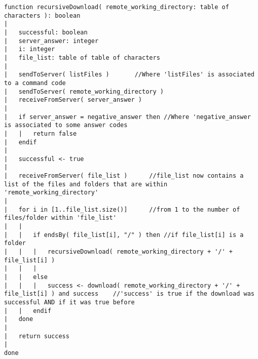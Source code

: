 \begin{lstlisting}
function recursiveDownload( remote_working_directory: table of characters ): boolean
|
|	successful: boolean
|	server_answer: integer
|	i: integer
|	file_list: table of table of characters
|
|	sendToServer( listFiles )		//Where 'listFiles' is associated to a command code
|	sendToServer( remote_working_directory )
|	receiveFromServer( server_answer )
|
|	if server_answer = negative_answer then	//Where 'negative_answer is associated to some answer codes
|	|	return false
|	endif
|
|	successful <- true	
|	
|	receiveFromServer( file_list )		//file_list now contains a list of the files and folders that are within 'remote_working_directory'
|
|	for i in [1..file_list.size()]		//from 1 to the number of files/folder within 'file_list'
|	|
|	|	if endsBy( file_list[i], "/" ) then	//if file_list[i] is a folder
|	|	|	recursiveDownload( remote_working_directory + '/' + file_list[i] )
|	|	|
|	|	else
|	|	|	success <- download( remote_working_directory + '/' + file_list[i] ) and success	//'success' is true if the download was successful AND if it was true before
|	|	endif
|	done
|
|	return success
|
done
\end{lstlisting}
